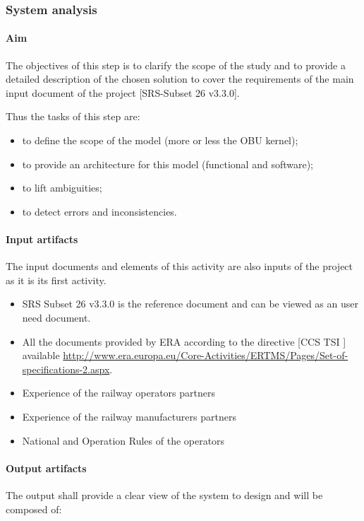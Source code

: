 \subsubsection{System analysis}

\paragraph{Aim}
The objectives of this step is to clarify the scope of the study and to provide a detailed description of the chosen solution to cover the requirements of the main input document of the project  [SRS-Subset 26 v3.3.0].

Thus the tasks of this step  are:
\begin{itemize}
\item to define the scope of the model (more or less the OBU kernel);
\item to provide an architecture for this model (functional and software);
\item to lift ambiguities;
\item to detect errors and inconsistencies.
\end{itemize}


\paragraph{Input artifacts}

The input documents and elements of this activity are also inputs of the project as it is its first activity.
\begin{itemize}
\item SRS Subset 26 v3.3.0 is the reference document and can be viewed as an user need document.
\item All the documents provided by ERA according to the directive [CCS TSI ] available \url{http://www.era.europa.eu/Core-Activities/ERTMS/Pages/Set-of-specifications-2.aspx}.
\item Experience of the railway operators partners
\item Experience of the railway manufacturers partners
\item National and Operation Rules of the operators
\end{itemize}

\paragraph{Output artifacts}

The output shall provide a clear view of the system to design and will be composed of:

